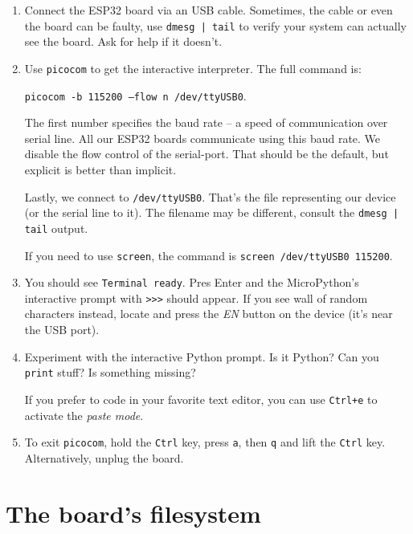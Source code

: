 \documentclass[a4paper,10pt]{article}
\begin{document}
\begin{enumerate}[resume]

\item Connect the ESP32 board via an USB cable.
      Sometimes, the cable or even the board can be faulty,
      use \texttt{dmesg | tail} to verify your system can actually see the board.
      Ask for help if it doesn't.

\item Use \texttt{picocom} to get the interactive interpreter.
      The full command is:

      \texttt{picocom -b 115200 --flow n /dev/ttyUSB0}.

      The first number specifies the baud rate -- a speed of communication over serial line.
      All our ESP32 boards communicate using this baud rate.
      We disable the flow control of the serial-port.
      That should be the default,
      but explicit is better than implicit.

      Lastly, we connect to \texttt{/dev/ttyUSB0}.
      That's the file representing our device (or the serial line to it).
      The filename may be different, consult the \texttt{dmesg | tail} output.

      If you need to use \texttt{screen},
      the command is \texttt{screen /dev/ttyUSB0 115200}.

\item You should see \texttt{Terminal ready}.
      Pres Enter and the MicroPython's interactive prompt with \texttt{>>>} should appear.
      If you see wall of random characters instead,
      locate and press the \emph{EN} button on the device
      (it's near the USB port).

\item Experiment with the interactive Python prompt. Is it Python?
      Can you \texttt{print} stuff? Is something missing?

      If you prefer to code in your favorite text editor,
      you can use \texttt{Ctrl+e} to activate the \emph{paste mode}.

\item To exit \texttt{picocom}, hold the \texttt{Ctrl} key, press \texttt{a},
      then \texttt{q} and lift the \texttt{Ctrl} key.
      Alternatively, unplug the board.

\end{enumerate}

\section*{The board's filesystem}
\end{document}
